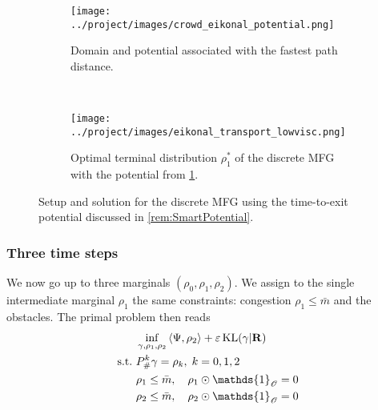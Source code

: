 \documentclass[../report.tex]{subfiles}
\begin{document}
\begin{figure}
	\centering
	\begin{subfigure}[b]{.45\linewidth}
		\centering
		\texttt{[image: ../project/images/crowd\_eikonal\_potential.png]}
		\caption{Domain and potential associated with the fastest path distance.}\label{fig:CrowdShortedPathPotential}
	\end{subfigure}~
	\begin{subfigure}[b]{.4\linewidth}
		\centering
		\texttt{[image: ../project/images/eikonal\_transport\_lowvisc.png]}
		\caption{Optimal terminal distribution $\rho^*_1$ of the discrete MFG with the potential from \cref{fig:CrowdShortedPathPotential}.}\label{fig:2MargEikonalGame}
	\end{subfigure}
	\caption{Setup and solution for the discrete MFG using the time-to-exit potential discussed in \cref{rem:SmartPotential}.}
\end{figure}


\subsubsection{Three time steps}

We now go up to three marginals $(\rho_0,\rho_1,\rho_2)$. We assign to the single intermediate marginal $\rho_1$ the same constraints: congestion $\rho_1 \leq \bar{m}$ and the obstacles. The primal problem then reads
\begin{equation}
\begin{aligned}
	&\inf_{\gamma,\rho_1,\rho_2}{} \langle \Psi, \rho_2\rangle + \epsilon \KL(\gamma | \bfR) \\
	\suchthat \ & P^k_\#\gamma = \rho_k,\; k = 0,1,2 \\
	& \rho_1 \leq \bar{m}, \quad \rho_1\odot\mathds{1}_{\mathscr O} = 0\\
	& \rho_2 \leq \bar{m}, \quad \rho_2\odot\mathds{1}_{\mathscr O} = 0
\end{aligned}
\end{equation}
\end{document}
